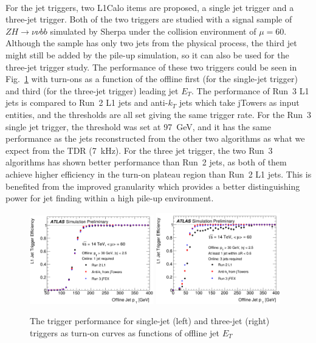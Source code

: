 \\For the jet triggers, two L1Calo items are proposed, a single jet trigger and a three-jet trigger. Both of the two triggers are studied with a signal sample of $ZH\to\nu\nu bb$ simulated by Sherpa under the collision environment of $\mu=60$. Although the sample has only two jets from the physical process, the third jet might still be added by the pile-up simulation, so it can also be used for the three-jet trigger study. The performance of these two triggers could be seen in Fig.~\ref{Fig:jet_perf} with turn-ons as a function of the offline first (for the single-jet trigger) and third (for the three-jet trigger) leading jet $E_{T}$. The performance of Run~3 L1 jets is compared to Run~2 L1 jets and anti-$k_{T}$ jets which take jTowers as input entities, and the thresholds are all set giving the same trigger rate. For the Run~3 single jet trigger, the threshold was set at 97~GeV, and it has the same performance as the jets reconstructed from the other two algorithms as what we expect from the TDR (7~kHz). For the three jet trigger, the two Run~3 algorithms has shown better performance than Run~2 jets, as both of them achieve higher efficiency in the turn-on plateau region than Run~2 L1 jets. This is benefited from the improved granularity which provides a better distinguishing power for jet finding within a high pile-up environment.  
\begin{figure}[!h]                
	\includegraphics[width=0.48\textwidth]{Chapter6/perf_1jet.png}
	\includegraphics[width=0.48\textwidth]{Chapter6/perf_3jets.png}
	\begin{center}
		\caption{The trigger performance for single-jet (left) and three-jet (right) triggers as turn-on curves as functions of offline jet $E_{T}$}
		\label{Fig:jet_perf}            
	\end{center}
\end{figure}
